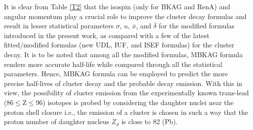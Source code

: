 \documentclass[preprint,10pt]{elsarticle}
\begin{document}
It is clear from Table \ref{T2} that the isospin (only for BKAG and RenA) and angular momentum play a crucial role to improve the cluster decay formulas and result in lesser statistical parameters $\sigma$, $u$, $\overline{x}$, and $\overline{\delta}$ for the modified formulas introduced in the present work, as compared with a few of the latest fitted/modified formulas (new UDL, IUF, and ISEF formulas) for the cluster decay. It is to be noted that among all the modified formulas, MBKAG formula renders more accurate half-life while compared through all the statistical parameters. Hence, MBKAG formula can be employed to predict the more precise half-lives of cluster decay and the probable decay emission. With this in view, the possibility of cluster emission from the experimentally known trans-lead (86$\leq$Z$\leq$96) isotopes is probed by considering the daughter nuclei near the proton shell closure i.e., the emission of a cluster is chosen in such a way that the proton number of daughter nucleus $Z_{d}$ is close to 82 (Pb).\par
\end{document}
